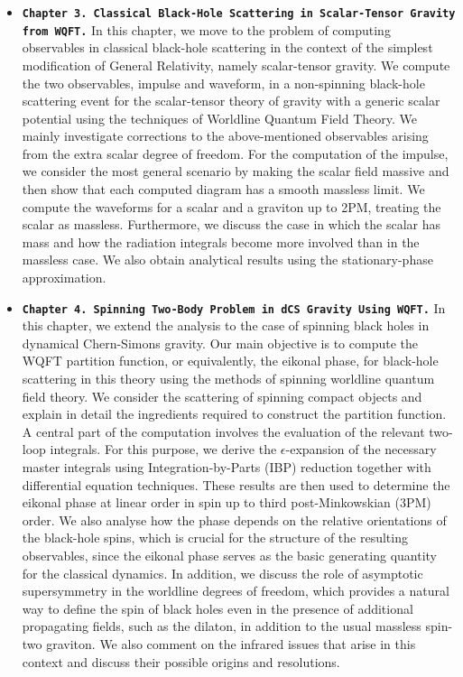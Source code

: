 \begin{itemize}[leftmargin=1.75em,topsep=0pt,itemsep=0.18em,parsep=0pt,partopsep=0pt]
  \item \textbf{\texttt{Chapter 3. Classical Black-Hole Scattering in Scalar-Tensor Gravity from WQFT.}} In this chapter, we move to the problem of computing observables in classical black-hole scattering in the context of the simplest modification of General Relativity, namely scalar-tensor gravity. We compute the two observables, impulse and waveform, in a non-spinning black-hole scattering event for the scalar-tensor theory of gravity with a generic scalar potential using the techniques of Worldline Quantum Field Theory. We mainly investigate corrections to the above-mentioned observables arising from the extra scalar degree of freedom. For the computation of the impulse, we consider the most general scenario by making the scalar field massive and then show that each computed diagram has a smooth massless limit. We compute the waveforms for a scalar and a graviton up to 2PM, treating the scalar as massless. Furthermore, we discuss the case in which the scalar has mass and how the radiation integrals become more involved than in the massless case. We also obtain analytical results using the stationary-phase approximation.

  \item \textbf{\texttt{Chapter 4. Spinning Two-Body Problem in dCS Gravity Using WQFT.}} In this chapter, we extend the analysis to the case of spinning black holes in dynamical Chern-Simons gravity. Our main objective is to compute the WQFT partition function, or equivalently, the eikonal phase, for black-hole scattering in this theory using the methods of spinning worldline quantum field theory. We consider the scattering of spinning compact objects and explain in detail the ingredients required to construct the partition function. A central part of the computation involves the evaluation of the relevant two-loop integrals. For this purpose, we derive the $\epsilon$-expansion of the necessary master integrals using Integration-by-Parts (IBP) reduction together with differential equation techniques. These results are then used to determine the eikonal phase at linear order in spin up to third post-Minkowskian (3PM) order. We also analyse how the phase depends on the relative orientations of the black-hole spins, which is crucial for the structure of the resulting observables, since the eikonal phase serves as the basic generating quantity for the classical dynamics. In addition, we discuss the role of asymptotic supersymmetry in the worldline degrees of freedom, which provides a natural way to define the spin of black holes even in the presence of additional propagating fields, such as the dilaton, in addition to the usual massless spin-two graviton. We also comment on the infrared issues that arise in this context and discuss their possible origins and resolutions.


\end{itemize}
